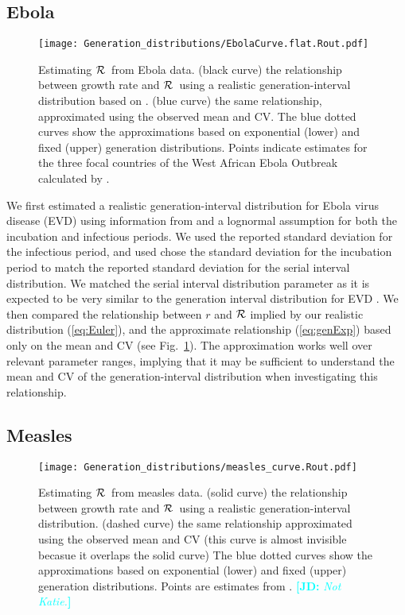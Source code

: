 \documentclass[12pt,]{article}
\newcommand{\RR}{\ensuremath{{\cal R}}}
\newcommand{\eref}[1]{(\ref{eq:#1})}
\newcommand{\fref}[1]{Fig.~\ref{fig:#1}}
\newcommand{\comment}[3]{\textcolor{#1}{\textbf{[#2: }\textit{#3}\textbf{]}}}
\newcommand{\jd}[1]{\comment{cyan}{JD}{#1}}
\begin{document}
\subsection{Ebola}

\begin{figure}[htbp] \centering
	\texttt{[image: Generation\_distributions/EbolaCurve.flat.Rout.pdf]}
	\caption{Estimating \RR~from Ebola data.
(black curve) the relationship between growth rate and \RR~using a realistic generation-interval distribution based on \cite{WHO14}.
(blue curve) the same relationship, approximated using the observed mean and CV. 
The blue dotted curves show the approximations based on exponential (lower) and fixed (upper) generation distributions.
Points indicate estimates for the three focal countries of the West African Ebola Outbreak calculated by \cite{WHO14}.
	\label{fig:EbolaCurve}}
\end{figure}

We first estimated a realistic generation-interval distribution for Ebola virus disease (EVD) using information from \cite{WHO14} and a lognormal assumption for both the incubation and infectious periods.
We used the reported standard deviation for the infectious period, and used chose the standard deviation for the incubation period to match the reported standard deviation for the serial interval distribution.
We matched the serial interval distribution parameter as it is expected to be very similar to the generation interval distribution for EVD \cite{WHO14}.
We  then compared the relationship between $r$ and $\RR$ implied by our realistic distribution \eref{Euler}, and the approximate relationship \eref{genExp} based only on the mean and CV (see \fref{EbolaCurve}). The approximation works well over relevant parameter ranges, implying that it may be sufficient to understand the mean and CV of the generation-interval distribution when investigating this relationship.

\subsection{Measles}

\begin{figure}[htbp] \centering
	\texttt{[image: Generation\_distributions/measles\_curve.Rout.pdf]}
	\caption{Estimating \RR~from measles data.
		(solid curve) the relationship between growth rate and \RR~using a realistic generation-interval distribution.
		(dashed curve) the same relationship approximated using the observed mean and CV (this curve is almost invisible becasue it overlaps the solid curve)
		The blue dotted curves show the approximations based on exponential (lower) and fixed (upper) generation distributions.
		Points are estimates from \cite{Katie}.
		\jd{Not Katie.}
	}
	\label{fig:measlesCurve}
\end{figure}
\end{document}
